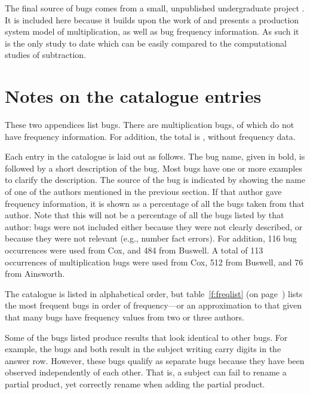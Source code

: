 The final source of bugs comes from a small, unpublished undergraduate
project \cite{shar}. It is included here because it builds upon the work of
 and presents a production system model of multiplication,
as well as bug frequency information.   As such it is the
only study to date which can be easily compared to the computational
studies of subtraction.

\section{Notes on the catalogue entries}

%
These two appendices list \Tbgs{} bugs. There are \Tx{} multiplication
bugs, of which \Txw{} do not have frequency information. For addition, the
total is \Tp{}, \Tpw{} without frequency data.

Each entry in the catalogue is laid out as follows. The bug name, given in
bold, is followed by a short description of the bug.  Most bugs have one or
more examples to clarify the description. The source of the bug is
indicated by showing the name of one of the authors mentioned in the
previous section.  If that author gave frequency information, it is shown
as a percentage of all the bugs taken from that author. Note that this will
not be a percentage of all
the bugs listed by that author: bugs were not included either
because they were not clearly described, or because they were not relevant
(e.g., number fact errors).  For addition, 116 bug occurrences were
used from Cox, and 484 from Buswell.  A total of 113 occurrences of
multiplication bugs were used from Cox, 512 from Buswell, and 76 from
Ainsworth.

The catalogue is listed in alphabetical order, but
table~\ref{f:freqlist} (on page~\pageref{f:freqlist}) lists
the most frequent bugs in order of
frequency---or an approximation to that given that many bugs have frequency
values from two or three authors.

Some of the bugs listed produce results that look identical to other bugs.
For example, the bugs  and  both result in the
subject writing carry digits in the answer row. However, these bugs qualify
as separate bugs because they have been observed independently of each
other. That is, a subject can fail to rename a partial product, yet
correctly rename when adding the partial product.

